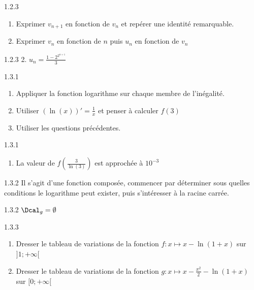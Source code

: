 \begin{Indication}{1.2.3}
	\begin{enumerate}
		\item Exprimer $v_{n+1}$ en fonction de $v_n$ et repérer une identité remarquable.
		\item Exprimer $v_n$ en fonction de $n$ puis $u_n$ en fonction de $v_n$
	\end{enumerate}
\end{Indication}
\begin{Solution}{1.2.3}
	2. $u_n=\frac{1-2^{2^{n+1}}}{3}$
\end{Solution}
\begin{Indication}{1.3.1}
	\begin{enumerate}
		\item Appliquer la fonction logarithme sur chaque membre de l'inégalité.
		\item Utiliser $\left(\ln(x)\right)'=\frac{1}{x}$ et penser à calculer $f(3)$
		\item[4.] Utiliser les questions précédentes.
	\end{enumerate}
\end{Indication}
\begin{Solution}{1.3.1}
	\begin{enumerate}
		\item[2.] La valeur de $f\left(\frac{3}{\ln(3)}\right)$ est approchée à $10^{-3}$\\
	\end{enumerate}
\end{Solution}
\begin{Indication}{1.3.2}
	Il s'agit d'une fonction composée, commencer par déterminer sous quelles conditions le logarithme peut exister, puis s'intéresser à la racine carrée.
\end{Indication}
\begin{Solution}{1.3.2}
	$\Dcal_g=\emptyset$
\end{Solution}
\begin{Indication}{1.3.3}
	\begin{enumerate}
		\item Dresser le tableau de variations de la fonction $f:x\mapsto x-\ln(1+x)$ sur $]1;+\infty[$
		\item Dresser le tableau de variations de la fonction $g:x\mapsto x-\frac{x^2}{2}-\ln(1+x)$ sur $[0;+\infty[$
	\end{enumerate}
\end{Indication}
